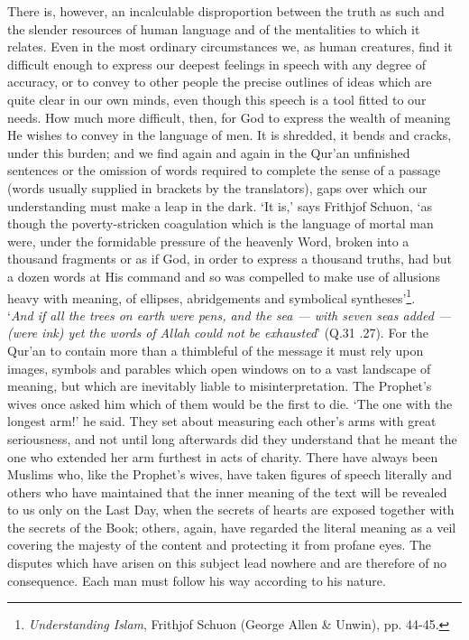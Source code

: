 \documentclass[10pt, twoside,openright]{book}
\begin{document}
There is, however, an incalculable disproportion between the truth as such and the slender resources 
of human language and of the mentalities to which it relates. Even in the most ordinary circumstances 
we, as human creatures, find it difficult enough to express our deepest feelings in speech with any 
degree of accuracy, or to convey to other people the precise outlines of ideas which are quite clear 
in our own minds, even though this speech is a tool fitted to our needs. How much more difficult, 
then, for God to express the wealth of meaning He wishes to convey in the language of men. It is 
shredded, it bends and cracks, under this burden; and we find again and again in the Qur'an 
unfinished sentences or the omission of words required to complete the sense of a passage (words 
usually supplied in brackets by the translators), gaps over which our understanding must make a leap 
in the dark. `It is,' says Frithjof Schuon, `as though the poverty-stricken coagulation which is the 
language of mortal man were, under the formidable pressure of the heavenly Word, broken into a 
thousand fragments or as if God, in order to express a thousand truths, had but a dozen words at His 
command and so was compelled to make use of allusions heavy with meaning, of ellipses, abridgements 
and symbolical syntheses'\footnote{\emph{Understanding Islam}, Frithjof Schuon (George Allen \& Unwin), pp. 44-45.}.\\

`\emph{And if all the trees on earth were pens, and the sea --- with seven seas added --- (were ink) yet the words of Allah could not be exhausted}' (Q.31 .27). For the Qur'an to contain more than a thimbleful of the message it must rely upon images, symbols and parables which open windows on to a vast landscape of meaning, but which are inevitably liable to misinterpretation. The Prophet's wives once asked him which of them would be the first to die. `The one with the longest arm!' he said. They set about 
measuring each other's arms with great seriousness, and not until long afterwards did they understand 
that he meant the one who extended her arm furthest in acts of charity. There have always been 
Muslims who, like the Prophet's wives, have taken figures of speech literally and others who have 
maintained that the inner meaning of the text will be revealed to us only on the Last Day, when the 
secrets of hearts are exposed together with the secrets of the Book; others, again, have regarded the 
literal meaning as a veil covering the majesty of the content and protecting it from profane eyes. 
The disputes which have arisen on this subject lead nowhere and are therefore of no consequence. Each 
man must follow his way according to his nature. \\
\end{document}
